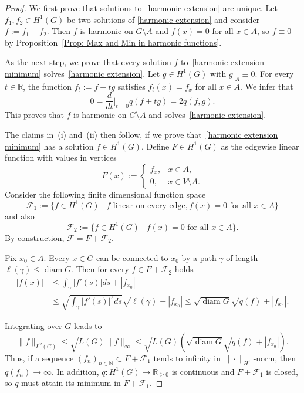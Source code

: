 \documentclass[reqno]{amsart}
\theoremstyle{plain}
\theoremstyle{definition}
\theoremstyle{remark}
\numberwithin{equation}{section}
\newcommand{\N}{\mathbb{N}}     %
\newcommand{\R}{\mathbb{R}}     %
\newcommand{\diam}{\operatorname{diam}}
\begin{document}
\begin{proof} 
We first prove that solutions to~\eqref{harmonic extension} are unique. Let $f_1,f_2 \in H^1(G)$ be two solutions of \eqref{harmonic extension} and consider $f:=f_1-f_2$. Then $f$ is harmonic on $G \setminus A$ and $f(x)=0$ for all $x \in A$, so $f \equiv 0$ by Proposition~\ref{Prop: Max and Min in harmonic functions}.

As  the next step, we prove that every solution $f$ to~\eqref{harmonic extension minimum} solves~\eqref{harmonic extension}. Let $g \in H^1(G)$ with $g\big|_{A} \equiv 0$. For every $t \in \R$, the function $f_t := f+tg$ satisfies $f_t(x) = f_x$ for all $x \in A$. We infer that 
		\[
		0 = \frac{d}{dt}\Big|_{t=0} q(f+tg) = 2q(f,g).
		\] 
This proves that $f$ is harmonic on $G\setminus A$ and solves~\eqref{harmonic extension}.

The claims in~(i) and~(ii) then follow, if we prove that~\eqref{harmonic extension minimum} has a solution $f \in H^1(G)$. Define $F \in H^1(G)$ as the edgewise linear function with values in vertices
		\[ 
		F(x) := \begin{cases}
			f_x,  & x \in A, \\
			0, & x \in V \setminus A.
		\end{cases}
		\]
		Consider the following finite dimensional function space
		\[\mathcal{F}_1 := \{f \in H^1(G) \; | \; f \text{ linear on every edge}, f(x) = 0 \text{ for all } x \in A \}\]
		and also 
		\[\mathcal{F}_2 := \{f \in H^1(G) \; | \; f(x) = 0 \text{ for all } x \in A\}.\]
		By construction, $\mathcal{F} = F + \mathcal{F}_2$.
		
		
		 Fix $x_0 \in A$. Every $x \in G$ can be connected to $x_0$ by a path $\gamma$ of length $\ell(\gamma)\le \diam G$. Then for every $f \in F + \mathcal{F}_2$ holds 
		\begin{align*}
			|f(x)| &\leq \int_{\gamma} |f'(s)| d s + |f_{x_0}|\\ &\leq \sqrt{\int_{\gamma} |f'(s)|^2 d s} \sqrt{\ell(\gamma)} + |f_{x_0}|  \leq  \sqrt{\diam G} \sqrt{q(f)}  + |f_{x_0}| . 
		\end{align*}
		
		Integrating over $G$ leads to
		\[
		\|f\|_{L^2(G)} \leq  \sqrt{L(G)} \|f\|_{\infty}  \leq  \sqrt{L(G)}( \sqrt{\diam G} \sqrt{q(f)} + |f_{x_0}|). 
		\]
		Thus, if a sequence $(f_n)_{n \in \N} \subset F +\mathcal{F}_1$ tends to infinity in $\|\cdot\|_{H^1}$-norm, then $q(f_n) \to \infty $. In addition, $q\colon H^1(G) \to \R_{\geq 0}$ is continuous and $F + \mathcal{F}_1$ is closed, so $q$ must attain its minimum in $F+\mathcal{F}_1$.
		

\end{proof}
\end{document}
